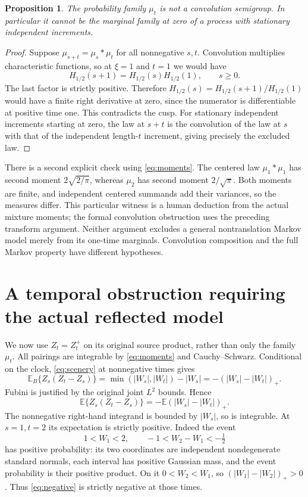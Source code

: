 \documentclass[11pt]{article}
\newtheorem{proposition}[theorem]{Proposition}
\newcommand{\E}{\mathbb E}
\begin{document}
\begin{proposition}\label{prop:nosemigroup}
The probability family $\mu_t$ is not a convolution semigroup.
In particular it cannot be the marginal family at zero of a process
with stationary independent increments.
\end{proposition}
\begin{proof}
Suppose $\mu_{s+t}=\mu_s*\mu_t$ for all nonnegative $s,t$.
Convolution multiplies characteristic functions, so at $\xi=1$
and $t=1$ we would have
\[
 H_{1/2}(s+1)=H_{1/2}(s)H_{1/2}(1),\qquad s\geq0.
\]
The last factor is strictly positive. Therefore
$H_{1/2}(s)=H_{1/2}(s+1)/H_{1/2}(1)$ would have a finite
right derivative at zero, since the numerator is differentiable at
positive time one. This contradicts the cusp.
For stationary independent increments starting at zero, the law at
$s+t$ is the convolution of the law at $s$ with that of the
independent length-$t$ increment, giving precisely the excluded law.
\end{proof}

There is a second explicit check using \eqref{eq:moments}.
The centered law $\mu_1*\mu_1$ has second moment
$2\sqrt{2/\pi}$, whereas $\mu_2$ has second moment $2/\sqrt\pi$.
Both moments are finite, and independent centered summands add
their variances, so the measures differ. This particular witness is
a human deduction from the actual mixture moments; the formal
convolution obstruction uses the preceding transform argument.
Neither argument excludes a general nontranslation Markov model
merely from its one-time marginals. Convolution composition and
the full Markov property have different hypotheses.

\section{A temporal obstruction requiring the actual reflected model}
We now use $Z_t=Z_t^+$ on its original source product, rather than
only the family $\mu_t$. All pairings are integrable by
\eqref{eq:moments} and Cauchy--Schwarz. Conditional on the clock,
\eqref{eq:scenery} at nonnegative times gives
\[
 \E_B\{Z_s(Z_t-Z_s)\}
  =\min(|W_s|,|W_t|)-|W_s|
  =-(|W_s|-|W_t|)_+.
\]
Fubini is justified by the original joint $L^2$ bounds. Hence
\begin{equation}\label{eq:negative}
 \E\{Z_s(Z_t-Z_s)\}
      =-\E (|W_s|-|W_t|)_+.
\end{equation}
The nonnegative right-hand integrand is bounded by $|W_s|$, so is
integrable. At $s=1,t=2$ its expectation is strictly positive.
Indeed the event
\[
 1<W_1<2,\qquad -1<W_2-W_1<-\tfrac12
\]
has positive probability: its two coordinates are independent
nondegenerate standard normals, each interval has positive Gaussian
mass, and the event probability is their positive product. On it
$0<W_2<W_1$, so $(|W_1|-|W_2|)_+>0$.
Thus \eqref{eq:negative} is strictly negative at those times.
\end{document}
